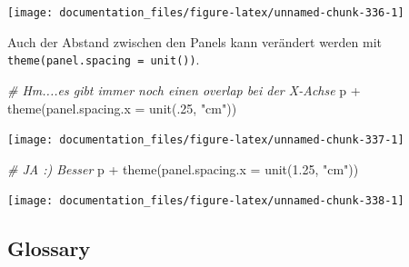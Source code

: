 \documentclass[
]{article}
\newenvironment{Shaded}{\begin{snugshade}}{\end{snugshade}}
\newcommand{\AttributeTok}[1]{\textcolor[rgb]{0.77,0.63,0.00}{#1}}
\newcommand{\CommentTok}[1]{\textcolor[rgb]{0.56,0.35,0.01}{\textit{#1}}}
\newcommand{\DecValTok}[1]{\textcolor[rgb]{0.00,0.00,0.81}{#1}}
\newcommand{\FloatTok}[1]{\textcolor[rgb]{0.00,0.00,0.81}{#1}}
\newcommand{\FunctionTok}[1]{\textcolor[rgb]{0.00,0.00,0.00}{#1}}
\newcommand{\NormalTok}[1]{#1}
\newcommand{\SpecialCharTok}[1]{\textcolor[rgb]{0.00,0.00,0.00}{#1}}
\newcommand{\StringTok}[1]{\textcolor[rgb]{0.31,0.60,0.02}{#1}}
\begin{document}
\begin{center}\texttt{[image: documentation\_files/figure-latex/unnamed-chunk-336-1]} \end{center}

Auch der Abstand zwischen den Panels kann verändert werden mit \texttt{theme(panel.spacing\ =\ unit())}.

\begin{Shaded}
\begin{Highlighting}[]
\CommentTok{\# Hm....es gibt immer noch einen overlap bei der X{-}Achse}
\NormalTok{p }\SpecialCharTok{+} \FunctionTok{theme}\NormalTok{(}\AttributeTok{panel.spacing.x =} \FunctionTok{unit}\NormalTok{(.}\DecValTok{25}\NormalTok{, }\StringTok{"cm"}\NormalTok{))}
\end{Highlighting}
\end{Shaded}

\begin{center}\texttt{[image: documentation\_files/figure-latex/unnamed-chunk-337-1]} \end{center}

\begin{Shaded}
\begin{Highlighting}[]
\CommentTok{\# JA :) Besser}
\NormalTok{p }\SpecialCharTok{+} \FunctionTok{theme}\NormalTok{(}\AttributeTok{panel.spacing.x =} \FunctionTok{unit}\NormalTok{(}\FloatTok{1.25}\NormalTok{, }\StringTok{"cm"}\NormalTok{))}
\end{Highlighting}
\end{Shaded}

\begin{center}\texttt{[image: documentation\_files/figure-latex/unnamed-chunk-338-1]} \end{center}

\hypertarget{glossary}{%
\subsection{Glossary}\label{glossary}}
\end{document}
